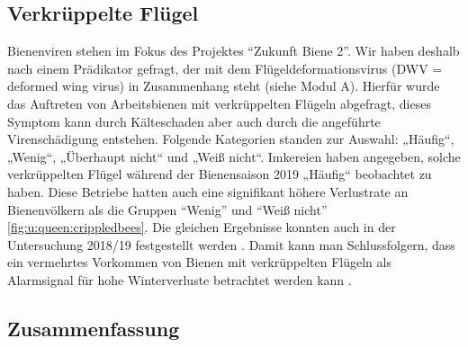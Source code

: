 \subsection{Verkrüppelte Flügel}

Bienenviren stehen im Fokus des Projektes \enquote{Zukunft Biene 2}. Wir haben deshalb nach einem Prädikator gefragt,
der mit dem Flügeldeformationsvirus (DWV = deformed wing virus) in Zusammenhang steht (siehe Modul A). Hierfür wurde das Auftreten von Arbeitsbienen mit verkrüppelten Flügeln abgefragt, dieses Symptom kann durch Kälteschaden aber auch durch die angeführte Virenschädigung entstehen. Folgende Kategorien standen zur Auswahl: „Häufig``, „Wenig``, „Überhaupt nicht`` und „Weiß nicht``. 
 Imkereien haben angegeben, solche verkrüppelten Flügel während der Bienensaison 2019 „Häufig`` beobachtet zu haben. Diese Betriebe hatten auch eine signifikant höhere Verlustrate an Bienenvölkern als  die Gruppen \enquote{Wenig} und \enquote{Weiß nicht} \cref{fig:u:queen:crippledbees}. Die gleichen Ergebnisse konnten auch in der Untersuchung 2018/19 festgestellt werden \citep{oberreiter2020}. Damit kann man Schlussfolgern, dass ein vermehrtes Vorkommen von Bienen mit verkrüppelten Flügeln als Alarmsignal für hohe Winterverluste betrachtet werden kann \citep{morawetz2019}.

\subsection{Zusammenfassung}

